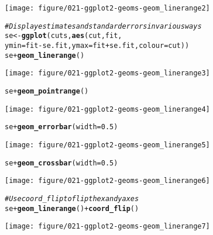 \documentclass[a4paper,titlepage]{tufte-handout}\usepackage[]{graphicx}\usepackage[]{color}
\makeatletter
\def\maxwidth{ %
  \ifdim\Gin@nat@width>\linewidth
    \linewidth
  \else
    \Gin@nat@width
  \fi
}
\newcommand{\hlnum}[1]{\textcolor[rgb]{0.686,0.059,0.569}{#1}}%
\newcommand{\hlcom}[1]{\textcolor[rgb]{0.678,0.584,0.686}{\textit{#1}}}%
\newcommand{\hlopt}[1]{\textcolor[rgb]{0,0,0}{#1}}%
\newcommand{\hlstd}[1]{\textcolor[rgb]{0.345,0.345,0.345}{#1}}%
\newcommand{\hlkwb}[1]{\textcolor[rgb]{0.69,0.353,0.396}{#1}}%
\newcommand{\hlkwc}[1]{\textcolor[rgb]{0.333,0.667,0.333}{#1}}%
\newcommand{\hlkwd}[1]{\textcolor[rgb]{0.737,0.353,0.396}{\textbf{#1}}}%
\newenvironment{kframe}{%
 \def\at@end@of@kframe{}%
 \ifinner\ifhmode%
  \def\at@end@of@kframe{\end{minipage}}%
  \begin{minipage}{\columnwidth}%
 \fi\fi%
 \def\FrameCommand##1{\hskip\@totalleftmargin \hskip-\fboxsep
 \colorbox{shadecolor}{##1}\hskip-\fboxsep
     \hskip-\linewidth \hskip-\@totalleftmargin \hskip\columnwidth}%
 \MakeFramed {\advance\hsize-\width
   \@totalleftmargin\z@ \linewidth\hsize
   \@setminipage}}%
 {\par\unskip\endMakeFramed%
 \at@end@of@kframe}
\newenvironment{knitrout}{}{} %
\makeatother
\begin{document}
\begin{knitrout}
\begin{kframe}
{\ttfamily\noindent\itshape{}}\end{kframe}
\texttt{[image: figure/021-ggplot2-geoms-geom\_linerange2]} 
\begin{kframe}\begin{alltt}
\hlcom{# Display estimates and standard errors in various ways}
\hlstd{se} \hlkwb{<-} \hlkwd{ggplot}\hlstd{(cuts,} \hlkwd{aes}\hlstd{(cut, fit,}
  \hlkwc{ymin} \hlstd{= fit} \hlopt{-} \hlstd{se.fit,} \hlkwc{ymax}\hlstd{=fit} \hlopt{+} \hlstd{se.fit,} \hlkwc{colour} \hlstd{= cut))}
\hlstd{se} \hlopt{+} \hlkwd{geom_linerange}\hlstd{()}
\end{alltt}
\end{kframe}
\texttt{[image: figure/021-ggplot2-geoms-geom\_linerange3]} 
\begin{kframe}\begin{alltt}
\hlstd{se} \hlopt{+} \hlkwd{geom_pointrange}\hlstd{()}
\end{alltt}
\end{kframe}
\texttt{[image: figure/021-ggplot2-geoms-geom\_linerange4]} 
\begin{kframe}\begin{alltt}
\hlstd{se} \hlopt{+} \hlkwd{geom_errorbar}\hlstd{(}\hlkwc{width} \hlstd{=} \hlnum{0.5}\hlstd{)}
\end{alltt}
\end{kframe}
\texttt{[image: figure/021-ggplot2-geoms-geom\_linerange5]} 
\begin{kframe}\begin{alltt}
\hlstd{se} \hlopt{+} \hlkwd{geom_crossbar}\hlstd{(}\hlkwc{width} \hlstd{=} \hlnum{0.5}\hlstd{)}
\end{alltt}
\end{kframe}
\texttt{[image: figure/021-ggplot2-geoms-geom\_linerange6]} 
\begin{kframe}\begin{alltt}
\hlcom{# Use coord_flip to flip the x and y axes}
\hlstd{se} \hlopt{+} \hlkwd{geom_linerange}\hlstd{()} \hlopt{+} \hlkwd{coord_flip}\hlstd{()}
\end{alltt}
\end{kframe}
\texttt{[image: figure/021-ggplot2-geoms-geom\_linerange7]} 
\begin{kframe}\begin{alltt}



\end{alltt}
\end{kframe}
\end{knitrout}
\end{document}
